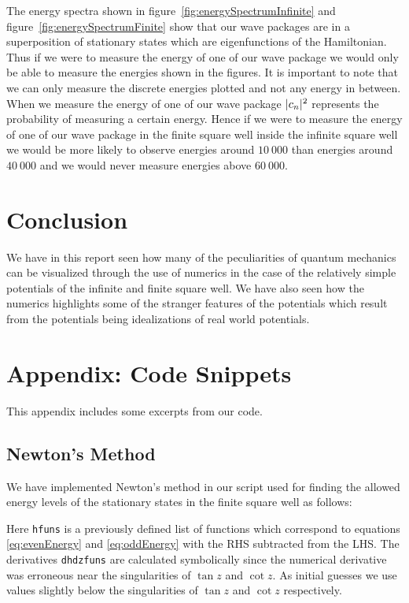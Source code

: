 \documentclass[12pt,a4paper]{article}
\DeclarePairedDelimiter{\abs}{\lvert}{\rvert}
\begin{document}
The energy spectra shown in figure~\ref{fig:energySpectrumInfinite} and figure~\ref{fig:energySpectrumFinite} show that our wave packages are in a superposition of stationary states which are eigenfunctions of the Hamiltonian. Thus if we were to measure the energy of one of our wave package we would only be able to measure the energies shown in the figures. It is important to note that we can only measure the discrete energies plotted and not any energy in between. When we measure the energy of one of our wave package $\abs{c_n}^2$ represents the probability of measuring a certain energy. Hence if we were to measure the energy of one of our wave package in the finite square well inside the infinite square well we would be more likely to observe energies around $10~000$ than energies around $40~000$ and we would never measure energies above $60~000$.

\section{Conclusion}
We have in this report seen how many of the peculiarities of quantum mechanics can be visualized through the use of numerics in the case of the relatively simple potentials of the infinite and finite square well. We have also seen how the numerics highlights some of the stranger features of the potentials which result from the potentials being idealizations of real world potentials.

\newpage
\appendix
\section{Appendix: Code Snippets}
This appendix includes some excerpts from our code.
\subsection{Newton's Method} \label{app:newton}
We have implemented Newton's method in our script used for finding the allowed energy levels of the stationary states in the finite square well as follows:

Here \lstinline{hfuns} is a previously defined list of functions which correspond to equations \eqref{eq:evenEnergy} and \eqref{eq:oddEnergy} with the RHS subtracted from the LHS. The derivatives \lstinline{dhdzfuns} are calculated symbolically since the numerical derivative was erroneous near the singularities of $\tan z$ and $\cot z$. As initial guesses we use values slightly below the singularities of $\tan z$ and $\cot z$ respectively.
\end{document}
